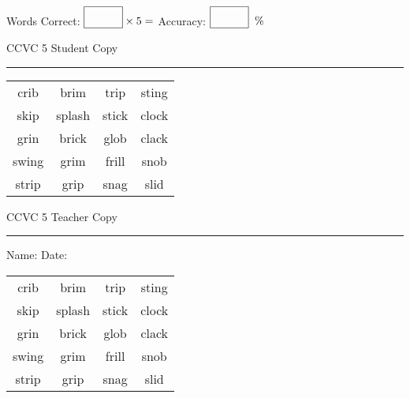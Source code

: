 \documentclass{memoir}
\begin{document}
\normalsize

Words Correct: $\fbox{\phantom{\huge 100}} \times 5 = $ Accuracy: $\fbox{\phantom{\huge 100}}\;\; \%$ 

\vfill

\newpage


\footnotesize \noindent
CCVC 5 \hfill Student Copy
\smallskip
\hrule

\Large

\setlength{\tabcolsep}{14pt}
\def\arraystretch{3}

{\selectfont


\begin{vplace}[0.5]
\begin{center}
\begin{tabular}{cccc}
crib & brim      & trip & sting \\
skip & splash & stick & clock \\
grin     & brick       & glob & clack             \\
swing & grim       & frill & snob \\
strip & grip      & snag & slid \\
\end{tabular}
\end{center}
\end{vplace}

}

\newpage

\footnotesize \noindent
CCVC 5 \hfill Teacher Copy
\smallskip
\hrule

\normalsize

\vfill

\noindent
Name: \underline{\hspace{1.75in}} \hfill Date: \underline{\hspace{1in}}

\Large

{\selectfont


\begin{vplace}[0.5]
\begin{center}
\begin{tabular}{cccc}
crib & brim      & trip & sting \\
skip & splash & stick & clock \\
grin     & brick       & glob & clack             \\
swing & grim       & frill & snob \\
strip & grip      & snag & slid \\
\end{tabular}
\end{center}
\end{vplace}



}
\end{document}
